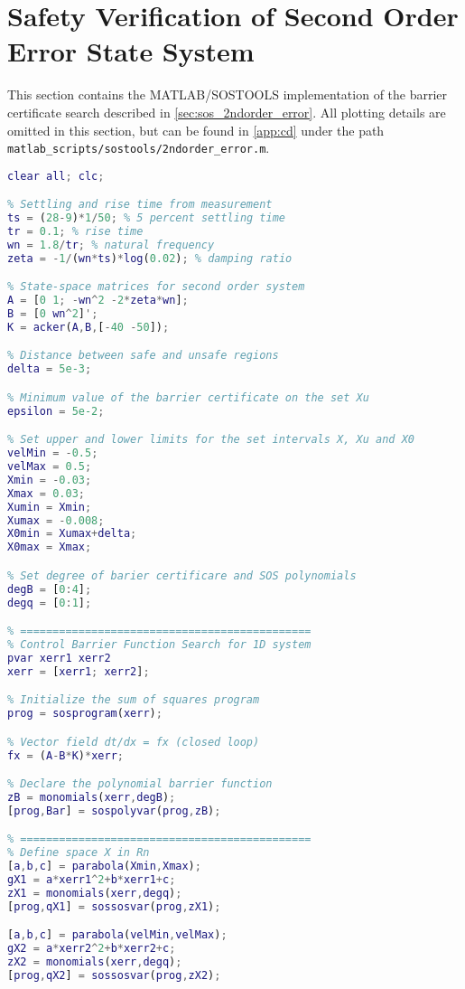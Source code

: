 \section{Safety Verification of Second Order Error State System}\label{app:sos_errorstate_secondorder}
This section contains the MATLAB/SOSTOOLS implementation of the barrier certificate search described in \autoref{sec:sos_2ndorder_error}. All plotting details are omitted in this section, but can be found in \autoref{app:cd} under the path \texttt{matlab\_scripts/sostools/2ndorder\_error.m}.

\begin{lstlisting}[language=matlab]
% 1D second order system FOR ERROR STATE
clear all; clc; 

% Settling and rise time from measurement
ts = (28-9)*1/50; % 5 percent settling time
tr = 0.1; % rise time
wn = 1.8/tr; % natural frequency
zeta = -1/(wn*ts)*log(0.02); % damping ratio

% State-space matrices for second order system
A = [0 1; -wn^2 -2*zeta*wn];
B = [0 wn^2]';
K = acker(A,B,[-40 -50]);

% Distance between safe and unsafe regions
delta = 5e-3;

% Minimum value of the barrier certificate on the set Xu
epsilon = 5e-2;

% Set upper and lower limits for the set intervals X, Xu and X0
velMin = -0.5;
velMax = 0.5;
Xmin = -0.03;
Xmax = 0.03;
Xumin = Xmin;
Xumax = -0.008;
X0min = Xumax+delta;
X0max = Xmax;

% Set degree of barier certificare and SOS polynomials
degB = [0:4];
degq = [0:1];

% =============================================
% Control Barrier Function Search for 1D system
pvar xerr1 xerr2
xerr = [xerr1; xerr2];

% Initialize the sum of squares program
prog = sosprogram(xerr);

% Vector field dt/dx = fx (closed loop)
fx = (A-B*K)*xerr;

% Declare the polynomial barrier function
zB = monomials(xerr,degB);
[prog,Bar] = sospolyvar(prog,zB);

% =============================================
% Define space X in Rn
[a,b,c] = parabola(Xmin,Xmax); 
gX1 = a*xerr1^2+b*xerr1+c;
zX1 = monomials(xerr,degq);
[prog,qX1] = sossosvar(prog,zX1);

[a,b,c] = parabola(velMin,velMax);
gX2 = a*xerr2^2+b*xerr2+c;
zX2 = monomials(xerr,degq);
[prog,qX2] = sossosvar(prog,zX2);


\end{lstlisting}
